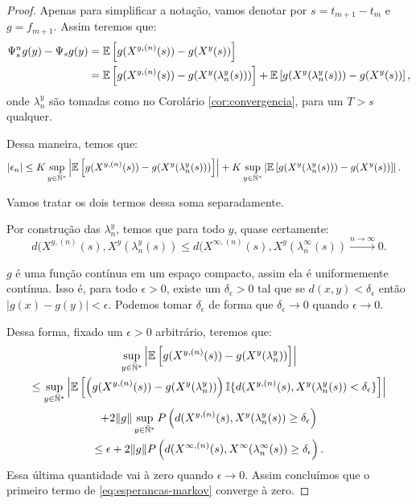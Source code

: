 \begin{proof}
  Apenas para simplificar a notação, vamos denotar por $s = t_{m+1} -
  t_m$ e $g = f_{m+1}$. Assim teremos que:
  \begin{align*}
    \Psi^n_{s} g (y) - \Psi_{s} g (y)
    &= {\mathbb{E}} \left[g(X^{y, (n)}(s)) - g(X^y(s)) \right] \notag \\
    &= {\mathbb{E}} \left[g(X^{y, (n)}(s)) - g(X^y(\lambda_n^y(s))) \right]
    + {\mathbb{E}} \left[g(X^y(\lambda_n^y(s))) - g(X^y(s)) \right],
  \end{align*}
  onde $\lambda_n^y$ são tomadas como no Corolário
  \ref{cor:convergencia}, para um $T > s$ qualquer.

  Dessa maneira, temos que:
  \begin{align}
    \label{eq:esperancas-markov}
    |\epsilon_n| &\leq 
    K \sup_{y\in{\mathbb{\bar{N}^*}}}\left\lvert
      {\mathbb{E}} \left[g(X^{y, (n)}(s)) - g(X^y(\lambda_n^y(s))) \right]
    \right\rvert
    + K \sup_{y\in{\mathbb{\bar{N}^*}}}\left\lvert
      {\mathbb{E}} \left[g(X^y(\lambda_n^y(s))) - g(X^y(s)) \right]
    \right\rvert. 
  \end{align}

  Vamos tratar os dois termos dessa soma separadamente.

  Por construção das $\lambda_n^y$, temos que para todo $y$, quase certamente:
  \begin{displaymath}
    d(X^{y, (n)}(s), X^y(\lambda_n^y(s)) \leq
    d(X^{\infty, (n)}(s), X^y(\lambda_n^\infty(s))
    \xrightarrow{n\to\infty} 0.
  \end{displaymath}

  $g$ é uma função contínua em um espaço compacto, assim ela é
  uniformemente contínua. Isso é, para todo $\epsilon > 0$, existe um
  $\delta_\epsilon > 0$ tal que se $d(x, y) < \delta_\epsilon$ então
  $|g(x)-g(y)| < \epsilon$. Podemos tomar $\delta_\epsilon$ de forma
  que $\delta_\epsilon \to 0$ quando $\epsilon \to 0$.

  Dessa forma, fixado um $\epsilon > 0$ arbitrário, teremos que:
  \begin{gather*}
    \sup_{y\in{\mathbb{\bar{N}^*}}} \left\lvert {\mathbb{E}} \left[ g(X^{y,(n)}(s)) -
        g(X^{y}(\lambda_n^y)) \right]
    \right\rvert\\
    \leq \sup_{y\in{\mathbb{\bar{N}^*}}} \left\lvert {\mathbb{E}} \left[ \left(g(X^{y,(n)}(s)) -
          g(X^{y}(\lambda_n^y)) \right) {\mathbb{I}}\{ d(X^{y, (n)}(s),
        X^y(\lambda_n^y(s)) < \delta_\epsilon \} \right]
    \right\rvert \\
    + 2\Vert g \Vert \sup_{y \in {\mathbb{\bar{N}^*}}} P\left( d(X^{y, (n)}(s),
      X^y(\lambda_n^y(s)) \geq
      \delta_\epsilon \right) \\
    \leq \epsilon + 2 \Vert g \Vert P \left( d(X^{\infty, (n)}(s),
      X^\infty(\lambda_n^\infty(s)) \geq \delta_\epsilon \right).
  \end{gather*}
  Essa última quantidade vai à zero quando $\epsilon \to 0$. Assim
  concluímos que o primeiro termo de \eqref{eq:esperancas-markov}
  converge à zero.


\end{proof}
